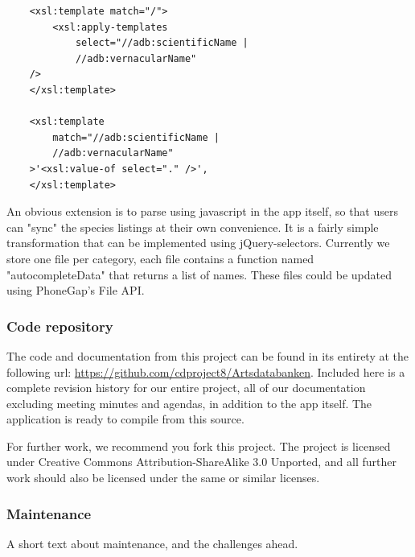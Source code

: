 \begin{lstlisting}
	<xsl:template match="/">
		<xsl:apply-templates 
			select="//adb:scientificName | 
			//adb:vernacularName" 
	/>
	</xsl:template>

	<xsl:template 
		match="//adb:scientificName | 
		//adb:vernacularName"
	>'<xsl:value-of select="." />',
	</xsl:template>
\end{lstlisting}

An obvious extension is to parse using javascript in the app itself, so
that users can "sync" the species listings at their own convenience. It is a
fairly simple transformation that can be implemented using jQuery-selectors.
Currently we store one file per category, each file contains a function named
"autocompleteData" that returns a list of names. These files could be updated
using PhoneGap's File API.

\subsubsection{Code repository}

The code and documentation from this project can be found in its entirety at
the following url: \url{https://github.com/cdproject8/Artsdatabanken}. Included
here is a complete revision history for our entire project, all of our
documentation excluding meeting minutes and agendas, in addition to the app
itself. The application is ready to compile from this source.

For further work, we recommend you fork this project. The project is licensed
under Creative Commons Attribution-ShareAlike 3.0 Unported, and all further
work should also be licensed under the same or similar licenses.

\subsubsection{Maintenance}
A short text about maintenance, and the challenges ahead.

